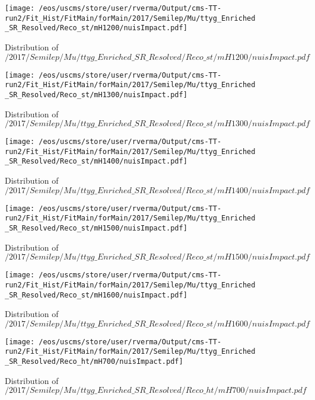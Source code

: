 \begin{figure}
\centering
\texttt{[image: /eos/uscms/store/user/rverma/Output/cms-TT-run2/Fit\_Hist/FitMain/forMain/2017/Semilep/Mu/ttyg\_Enriched\_SR\_Resolved/Reco\_st/mH1200/nuisImpact.pdf]}
\caption{Distribution of $/2017/Semilep/Mu/ttyg\_Enriched\_SR\_Resolved/Reco\_st/mH1200/nuisImpact.pdf$}
\end{figure}

\begin{figure}
\centering
\texttt{[image: /eos/uscms/store/user/rverma/Output/cms-TT-run2/Fit\_Hist/FitMain/forMain/2017/Semilep/Mu/ttyg\_Enriched\_SR\_Resolved/Reco\_st/mH1300/nuisImpact.pdf]}
\caption{Distribution of $/2017/Semilep/Mu/ttyg\_Enriched\_SR\_Resolved/Reco\_st/mH1300/nuisImpact.pdf$}
\end{figure}

\begin{figure}
\centering
\texttt{[image: /eos/uscms/store/user/rverma/Output/cms-TT-run2/Fit\_Hist/FitMain/forMain/2017/Semilep/Mu/ttyg\_Enriched\_SR\_Resolved/Reco\_st/mH1400/nuisImpact.pdf]}
\caption{Distribution of $/2017/Semilep/Mu/ttyg\_Enriched\_SR\_Resolved/Reco\_st/mH1400/nuisImpact.pdf$}
\end{figure}

\begin{figure}
\centering
\texttt{[image: /eos/uscms/store/user/rverma/Output/cms-TT-run2/Fit\_Hist/FitMain/forMain/2017/Semilep/Mu/ttyg\_Enriched\_SR\_Resolved/Reco\_st/mH1500/nuisImpact.pdf]}
\caption{Distribution of $/2017/Semilep/Mu/ttyg\_Enriched\_SR\_Resolved/Reco\_st/mH1500/nuisImpact.pdf$}
\end{figure}

\begin{figure}
\centering
\texttt{[image: /eos/uscms/store/user/rverma/Output/cms-TT-run2/Fit\_Hist/FitMain/forMain/2017/Semilep/Mu/ttyg\_Enriched\_SR\_Resolved/Reco\_st/mH1600/nuisImpact.pdf]}
\caption{Distribution of $/2017/Semilep/Mu/ttyg\_Enriched\_SR\_Resolved/Reco\_st/mH1600/nuisImpact.pdf$}
\end{figure}

\begin{figure}
\centering
\texttt{[image: /eos/uscms/store/user/rverma/Output/cms-TT-run2/Fit\_Hist/FitMain/forMain/2017/Semilep/Mu/ttyg\_Enriched\_SR\_Resolved/Reco\_ht/mH700/nuisImpact.pdf]}
\caption{Distribution of $/2017/Semilep/Mu/ttyg\_Enriched\_SR\_Resolved/Reco\_ht/mH700/nuisImpact.pdf$}
\end{figure}

